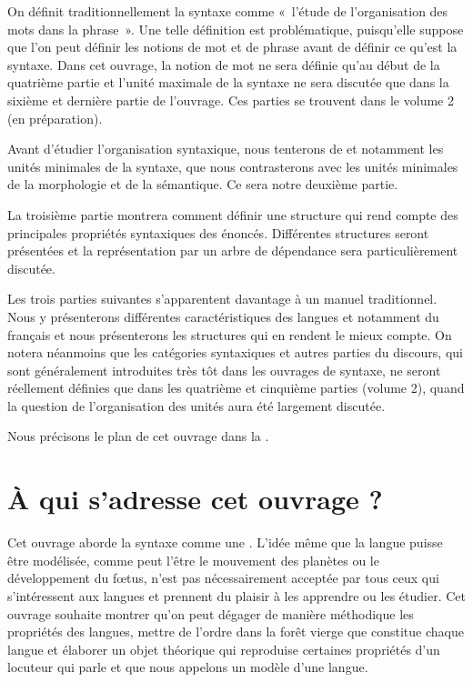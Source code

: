 On définit traditionnellement la syntaxe comme «~l’étude de l’organisation des mots dans la phrase~». Une telle définition est problématique, puisqu’elle suppose que l’on peut définir les notions de mot et de phrase avant de définir ce qu’est la syntaxe. Dans cet ouvrage, la notion de mot ne sera définie qu’au début de la quatrième partie et l’unité maximale de la syntaxe ne sera discutée que dans la sixième et dernière partie de l’ouvrage. Ces parties se trouvent dans le volume 2 (en préparation).

Avant d’étudier l’organisation syntaxique, nous tenterons de  et notamment les unités minimales de la syntaxe, que nous contrasterons avec les unités minimales de la morphologie et de la sémantique. Ce sera notre deuxième partie.

La troisième partie montrera comment définir une structure qui rend compte des principales propriétés syntaxiques des énoncés. Différentes structures seront présentées et la représentation par un arbre de dépendance sera particulièrement discutée.

Les trois parties suivantes s’apparentent davantage à un manuel traditionnel. Nous y présenterons différentes caractéristiques des langues et notamment du français et nous présenterons les structures qui en rendent le mieux compte. On notera néanmoins que les catégories syntaxiques et autres parties du discours, qui sont généralement introduites très tôt dans les ouvrages de syntaxe, ne seront réellement définies que dans les quatrième et cinquième parties (volume 2), quand la question de l’organisation des unités aura été largement discutée.

Nous précisons le plan de cet ouvrage dans la .

\section{À qui s’adresse cet ouvrage ?}\label{sec:0.0.3}

Cet ouvrage aborde la syntaxe comme une  . L’idée même que la langue puisse être modélisée, comme peut l’être le mouvement des planètes ou le développement du fœtus, n’est pas nécessairement acceptée par tous ceux qui s’intéressent aux langues et prennent du plaisir à les apprendre ou les étudier. Cet ouvrage souhaite montrer qu’on peut dégager de manière méthodique les propriétés des langues, mettre de l’ordre dans la forêt vierge que constitue chaque langue et élaborer un objet théorique qui reproduise certaines propriétés d’un locuteur qui parle et que nous appelons un modèle d’une langue.

